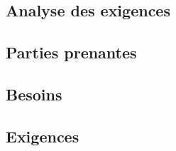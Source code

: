 \textcolor[RGB]{46, 116, 181}{\chapter{Analyse des exigences}}
\section{Parties prenantes}

\section{Besoins}

\section{Exigences}

